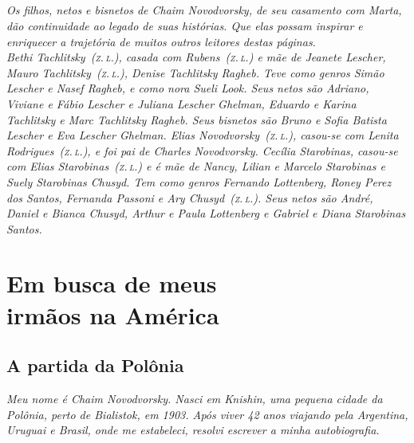 \chapter*{}
\thispagestyle{empty}

\vfill
\begin{flushright}
\footnotesize
\textit{Os filhos, netos e bisnetos de Chaim Novodvorsky, de seu casamento com Marta, dão continuidade ao legado de suas histórias. Que elas possam inspirar e enriquecer a trajetória de muitos outros leitores destas páginas.\\
\medskip
Bethi Tachlitsky~(\textsc{z.\,l.}), casada com Rubens~(\textsc{z.\,l.}) e mãe de Jeanete Lescher, Mauro Tachlitsky~(\textsc{z.\,l.}), Denise Tachlitsky Ragheb. Teve como genros Simão Lescher e Nasef Ragheb, e como nora Sueli Look. Seus netos são Adriano, Viviane e Fábio Lescher e Juliana Lescher Ghelman, Eduardo e Karina Tachlitsky e Marc Tachlitsky Ragheb. Seus bisnetos são Bruno e Sofia Batista Lescher e Eva Lescher Ghelman. Elias Novodvorsky~(\textsc{z.\,l.}), casou-se com Lenita Rodrigues~(\textsc{z.\,l.}), e foi pai de Charles Novodvorsky. Cecília Starobinas, casou-se com Elias Starobinas~(\textsc{z.\,l.}) e é mãe de Nancy, Lilian e Marcelo Starobinas e Suely Starobinas Chusyd. Tem como genros Fernando Lottenberg, Roney Perez dos Santos, Fernanda Passoni e Ary Chusyd~(\textsc{z.\,l.}). Seus netos são André, Daniel e Bianca Chusyd, Arthur e Paula Lottenberg e Gabriel e Diana Starobinas Santos.} 
\end{flushright}


\part[Em busca de meus irmãos na América]{Em busca de meus\\irmãos na América}
\openany
\chapter{A partida da Polônia}

\textit{Meu nome é Chaim Novodvorsky. Nasci em Knishin, uma pequena cidade da
Polônia, perto de Bialistok, em 1903. Após viver 42 anos viajando pela
Argentina, Uruguai e Brasil, onde me estabeleci, resolvi escrever a minha
autobiografia.}


